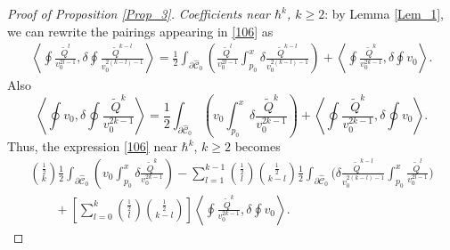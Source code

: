 \documentclass[10pt,a4paper]{article}
\numberwithin{equation}{section}
\theoremstyle{definition}
\begin{document}
\begin{proof}[Proof of Proposition \ref{Prop_3}]
\textit{Coefficients near $\hbar^k$, $k \geq 2$}: by Lemma \ref{Lem_1}, we can rewrite the pairings appearing in \eqref{106} as
\begin{gather*}%
\left\langle \oint \frac{\tilde{Q}^l}{v_0^{2l-1}}, \delta \oint \frac{\tilde{Q}^{k-l}}{v_0^{2(k-l)-1}}\right\rangle =\frac{1}{2}\int_{\partial \hat{\mathcal{C}}_0}\left( \frac{\tilde{Q}^l}{v_0^{2l-1}}
\int^x_{p_0}\delta \frac{\tilde{Q}^{k-l}}{v_0^{2(k-l)-1}}\right)+\left\langle \oint\frac{\tilde{Q}^k}{v_0^{2k-1}},\delta \oint v_0\right\rangle. \end{gather*}
Also
\begin{equation*}%
\left\langle \oint v_0, \delta \oint \frac{\tilde{Q}^k}{v_0^{2k-1}}\right\rangle =\frac{1}{2}\int_{\partial \hat{\mathcal{C}}_0}\left(v_0
\int^x_{p_0}\delta\frac{\tilde{Q}^k}{v_0^{2k-1}}\right)+\left\langle \oint \frac{\tilde{Q}^k}{v_0^{2k-1}},\delta \oint v_0\right\rangle.
\end{equation*}
Thus, the expression \eqref{106} near $\hbar^k$, $k \geq 2$ becomes
\begin{gather}\label{118}
\binom{\frac{1}{2}}{k}\frac{1}{2}\int_{\partial \hat{\mathcal{C}}_0}\left(v_0
\int^x_{p_0}\delta\frac{\tilde{Q}^k}{v_0^{2k-1}}\right)
-\sum^{k-1}_{l=1}\binom{\frac{1}{2}}{l} \binom{\frac{1}{2}}{k-l}\frac{1}{2}\int_{\partial
\hat{\mathcal{C}}_0}\Bigg(\delta \frac{\tilde{Q}^{k-l}}{v_0^{2(k-l)-1}}
\int^x_{p_0}\frac{\tilde{Q}^l}{v_0^{2l-1}}\Bigg)\\
 \label{119}\qquad{} +\left[ \sum^{k}_{l=0}\binom{\frac{1}{2}}{l}\binom{\frac{1}{2}}{k-l}\right]
 \left\langle \oint \frac{\tilde{Q}^k}{v_0^{2k-1}},\delta \oint v_0\right\rangle .
 \end{gather}


\end{proof}
\end{document}
